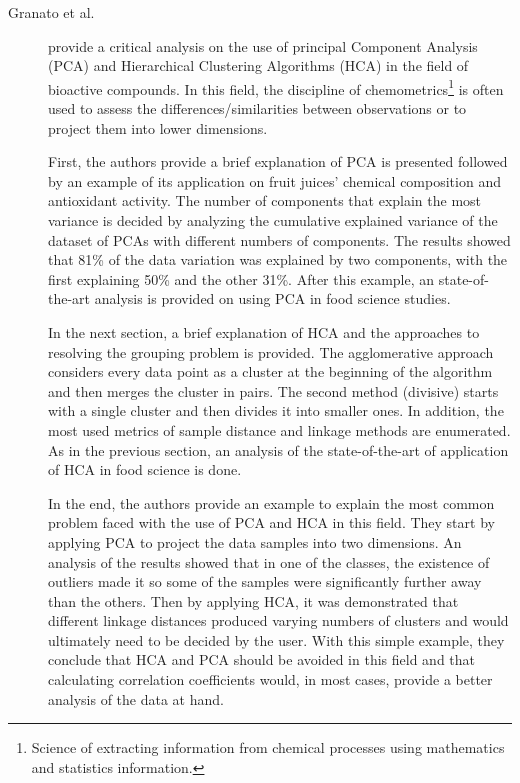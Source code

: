 \begin{description}
    \item[Granato et al.]\cite{Granato.Santos.ea_Useprincipalcomponent_2018} provide a critical analysis on the use of principal Component Analysis (PCA) and Hierarchical Clustering Algorithms (HCA) in the field of bioactive compounds. In this field, the discipline of chemometrics\footnote{Science of extracting information from chemical processes using mathematics and statistics information.} is often used to assess the differences/similarities between observations or to project them into lower dimensions. 
    
    First, the authors provide a brief explanation of PCA is presented followed by an example of its application on fruit juices' chemical composition and antioxidant activity. The number of components that explain the most variance is decided by analyzing the cumulative explained variance of the dataset of PCAs with different numbers of components. The results showed that 81\% of the data variation was explained by two components, with the first explaining 50\% and the other 31\%. After this example, an state-of-the-art analysis is provided on using PCA in food science studies.

    In the next section, a brief explanation of HCA and the approaches to resolving the grouping problem is provided.  The agglomerative approach considers every data point as a cluster at the beginning of the algorithm and then merges the cluster in pairs. The second method (divisive) starts with a single cluster and then divides it into smaller ones. In addition, the most used metrics of sample distance and linkage methods are enumerated. As in the previous section, an analysis of the state-of-the-art of application of HCA in food science is done. 
    
    In the end, the authors provide an example to explain the most common problem faced with the use of PCA and HCA in this field. They start by applying PCA to project the data samples into two dimensions. An analysis of the results showed that in one of the classes, the existence of outliers made it so some of the samples were significantly further away than the others. Then by applying HCA, it was demonstrated that different linkage distances produced varying numbers of clusters and would ultimately need to be decided by the user. With this simple example, they conclude that HCA and PCA should be avoided in this field and that calculating correlation coefficients would, in most cases, provide a better analysis of the data at hand.
\end{description}

